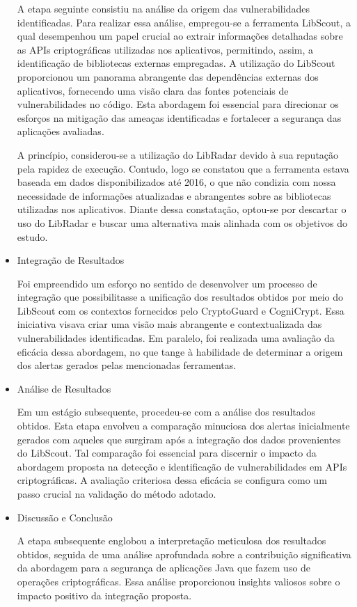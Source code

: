 \begin{itemize}
A etapa seguinte consistiu na análise da origem das vulnerabilidades identificadas. Para realizar essa análise, empregou-se a ferramenta LibScout, a qual desempenhou um papel crucial ao extrair informações detalhadas sobre as APIs criptográficas utilizadas nos aplicativos, permitindo, assim, a identificação de bibliotecas externas empregadas. A utilização do LibScout proporcionou um panorama abrangente das dependências externas dos aplicativos, fornecendo uma visão clara das fontes potenciais de vulnerabilidades no código. Esta abordagem foi essencial para direcionar os esforços na mitigação das ameaças identificadas e fortalecer a segurança das aplicações avaliadas.

A princípio, considerou-se a utilização do LibRadar devido à sua reputação pela rapidez de execução. Contudo, logo se constatou que a ferramenta estava baseada em dados disponibilizados até 2016, o que não condizia com nossa necessidade de informações atualizadas e abrangentes sobre as bibliotecas utilizadas nos aplicativos. Diante dessa constatação, optou-se por descartar o uso do LibRadar e buscar uma alternativa mais alinhada com os objetivos do estudo.

\item{Integração de Resultados}

Foi empreendido um esforço no sentido de desenvolver um processo de integração que possibilitasse a unificação dos resultados obtidos por meio do LibScout com os contextos fornecidos pelo CryptoGuard e CogniCrypt. Essa iniciativa visava criar uma visão mais abrangente e contextualizada das vulnerabilidades identificadas. Em paralelo, foi realizada uma avaliação da eficácia dessa abordagem, no que tange à habilidade de determinar a origem dos alertas gerados pelas mencionadas ferramentas.

\item{Análise de Resultados}

Em um estágio subsequente, procedeu-se com a análise dos resultados obtidos. Esta etapa envolveu a comparação minuciosa dos alertas inicialmente gerados com aqueles que surgiram após a integração dos dados provenientes do LibScout. Tal comparação foi essencial para discernir o impacto da abordagem proposta na detecção e identificação de vulnerabilidades em APIs criptográficas. A avaliação criteriosa dessa eficácia se configura como um passo crucial na validação do método adotado.
\item{Discussão e Conclusão}

A etapa subsequente englobou a interpretação meticulosa dos resultados obtidos, seguida de uma análise aprofundada sobre a contribuição significativa da abordagem para a segurança de aplicações Java que fazem uso de operações criptográficas. Essa análise proporcionou insights valiosos sobre o impacto positivo da integração proposta.


\end{itemize}
